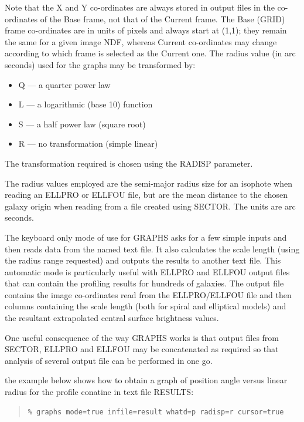 \documentclass[twoside,11pt]{article}
\newenvironment{myquote}{\begin{quote}\begin{small}}{\end{small}\end{quote}}
\begin{document}
Note that the X and Y co-ordinates are always stored in output files
in the co-ordinates of the Base frame, not that of the Current frame.
The Base (GRID) frame co-ordinates are in units of pixels and 
always start at (1,1); they remain the same for a given image NDF,
whereas Current co-ordinates may change according to which frame is
selected as the Current one.
The radius value (in arc seconds) used for the graphs may be transformed by:

\begin{itemize}
\item[] Q --- a quarter power law
\item[] L --- a logarithmic (base 10) function
\item[] S --- a half power law (square root)
\item[] R --- no transformation (simple linear)
\end{itemize}

The transformation required is chosen using the RADISP parameter.

The radius values employed are the semi-major radius size for an isophote 
when reading an ELLPRO or ELLFOU file, but are the mean distance to the 
chosen galaxy origin when reading from a file created using SECTOR. The 
units are arc seconds. 

The keyboard only mode of use for GRAPHS asks for a few simple inputs and then
reads data from the named text file. It also calculates the scale length 
(using the radius range requested) and outputs the results to another text 
file. This automatic mode is particularly useful with ELLPRO and ELLFOU 
output files that can contain the profiling results for hundreds of galaxies. 
The output file contains the image co-ordinates read from the ELLPRO/ELLFOU 
file and then columns containing the scale length (both for spiral and 
elliptical models) and the resultant extrapolated central surface 
brightness values.

One useful consequence of the way GRAPHS works is that output files from
SECTOR, ELLPRO and ELLFOU may be concatenated as required so that
analysis of several output file can be performed in one go.

the example below shows how to obtain a graph of position angle versus linear
radius for the profile conatine in text file RESULTS:

\begin{myquote}
\begin{verbatim}
% graphs mode=true infile=result whatd=p radisp=r cursor=true 
\end{verbatim}
\end{myquote}
\end{document}
